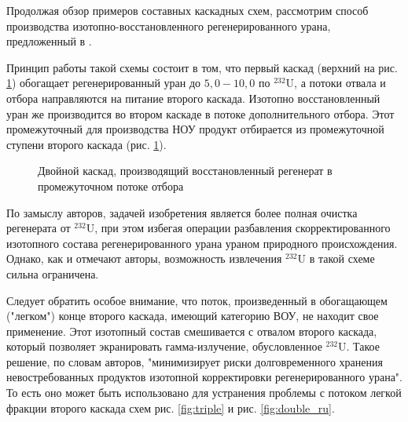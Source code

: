 Продолжая обзор примеров составных каскадных схем, рассмотрим способ производства изотопно-восстановленного регенерированного урана, предложенный в \cite{SposobIzotopnogoVosstanovleniyac}.

Принцип работы такой схемы состоит в том, что первый каскад (верхний на рис. \ref{fig:double_crazy}) обогащает регенерированный уран до $5,0-10,0$ по $^{232}$U, а потоки отвала и отбора направляются на питание второго каскада.
Изотопно восстановленный уран же производится во втором каскаде в потоке дополнительного отбора.
Этот промежуточный для производства НОУ продукт отбирается из промежуточной ступени второго каскада (рис. \ref{fig:double_crazy}).
\begin{figure}[ht]
  \caption{Двойной каскад, производящий восстановленный регенерат в промежуточном потоке отбора}\label{fig:double_crazy}
\end{figure}

По замыслу авторов, задачей изобретения является более полная очистка регенерата от $^{232}$U, при этом избегая операции разбавления скорректированного изотопного состава регенерированного урана ураном природного происхождения.
Однако, как и отмечают авторы, возможность извлечения $^{232}$U в такой схеме сильна ограничена.

Следует обратить особое внимание, что поток, произведенный в обогащающем ("легком") конце второго каскада, имеющий категорию ВОУ, не находит свое применение.
Этот изотопный состав смешивается с отвалом второго каскада, который позволяет экранировать гамма-излучение, обусловленное $^{232}$U.
Такое решение, по словам авторов, "минимизирует риски долговременного хранения невостребованных продуктов изотопной корректировки регенерированного урана".
То есть оно может быть использовано для устранения проблемы с потоком легкой фракции второго каскада схем рис. \ref{fig:triple} и рис. \ref{fig:double_ru}.


